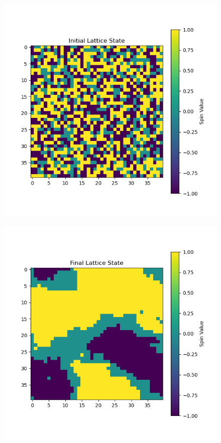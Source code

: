 \documentclass[12pt]{article}
\begin{document}
\begin{figure}
  \centering
  \includegraphics[max width=\textwidth]{lattice_state_0_0.75.png}
\end{figure}
\begin{figure}
  \centering
  \includegraphics[max width=\textwidth]{lattice_state_9999_0.75.png}
\end{figure}
\end{document}
